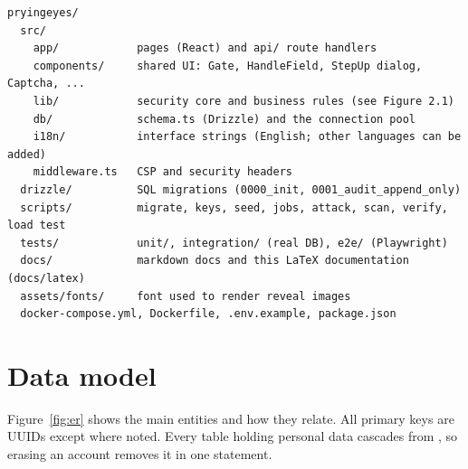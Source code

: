 \begin{lstlisting}
pryingeyes/
  src/
    app/            pages (React) and api/ route handlers
    components/     shared UI: Gate, HandleField, StepUp dialog, Captcha, ...
    lib/            security core and business rules (see Figure 2.1)
    db/             schema.ts (Drizzle) and the connection pool
    i18n/           interface strings (English; other languages can be added)
    middleware.ts   CSP and security headers
  drizzle/          SQL migrations (0000_init, 0001_audit_append_only)
  scripts/          migrate, keys, seed, jobs, attack, scan, verify, load test
  tests/            unit/, integration/ (real DB), e2e/ (Playwright)
  docs/             markdown docs and this LaTeX documentation (docs/latex)
  assets/fonts/     font used to render reveal images
  docker-compose.yml, Dockerfile, .env.example, package.json
\end{lstlisting}

\section{Data model}

Figure~\ref{fig:er} shows the main entities and how they relate. All primary keys are UUIDs except where noted. Every table holding personal data cascades from , so erasing an account removes it in one statement.

